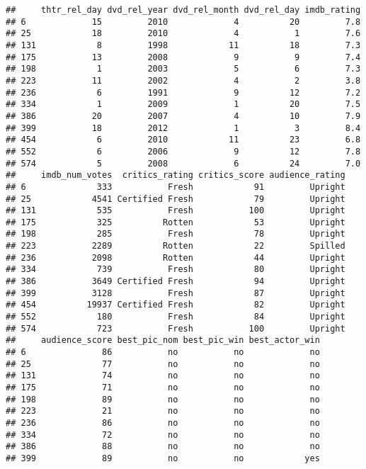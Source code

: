\documentclass[]{article}
\begin{document}
\begin{verbatim}
##     thtr_rel_day dvd_rel_year dvd_rel_month dvd_rel_day imdb_rating
## 6             15         2010             4          20         7.8
## 25            18         2010             4           1         7.6
## 131            8         1998            11          18         7.3
## 175           13         2008             9           9         7.4
## 198            1         2003             5           6         7.3
## 223           11         2002             4           2         3.8
## 236            6         1991             9          12         7.2
## 334            1         2009             1          20         7.5
## 386           20         2007             4          10         7.9
## 399           18         2012             1           3         8.4
## 454            6         2010            11          23         6.8
## 552            6         2006             9          12         7.8
## 574            5         2008             6          24         7.0
##     imdb_num_votes  critics_rating critics_score audience_rating
## 6              333           Fresh            91         Upright
## 25            4541 Certified Fresh            79         Upright
## 131            535           Fresh           100         Upright
## 175            325          Rotten            53         Upright
## 198            285           Fresh            78         Upright
## 223           2289          Rotten            22         Spilled
## 236           2098          Rotten            44         Upright
## 334            739           Fresh            80         Upright
## 386           3649 Certified Fresh            94         Upright
## 399           3128           Fresh            87         Upright
## 454          19937 Certified Fresh            82         Upright
## 552            180           Fresh            84         Upright
## 574            723           Fresh           100         Upright
##     audience_score best_pic_nom best_pic_win best_actor_win
## 6               86           no           no             no
## 25              77           no           no             no
## 131             74           no           no             no
## 175             71           no           no             no
## 198             89           no           no             no
## 223             21           no           no             no
## 236             86           no           no             no
## 334             72           no           no             no
## 386             88           no           no             no
## 399             89           no           no            yes

\end{verbatim}
\end{document}
